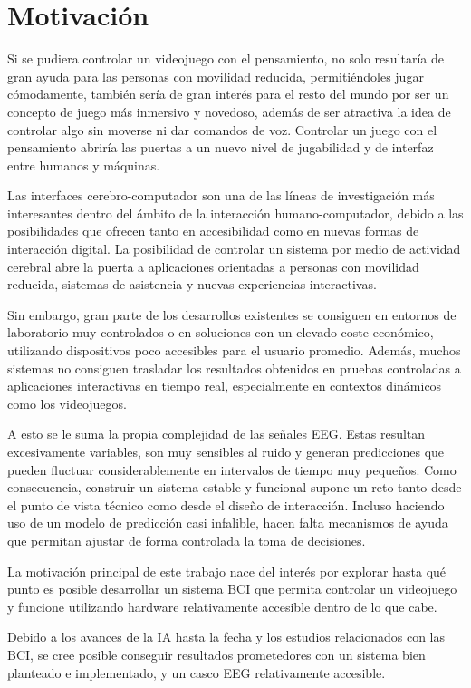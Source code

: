 \section{Motivación}

Si se pudiera controlar un videojuego con el pensamiento, no solo resultaría de
gran ayuda para las personas con movilidad reducida, permitiéndoles jugar
cómodamente, también sería de gran interés para el resto del mundo por ser un
concepto de juego más inmersivo y novedoso, además de ser atractiva la idea de
controlar algo sin moverse ni dar comandos de voz. Controlar un juego con el
pensamiento abriría las puertas a un nuevo nivel de jugabilidad y de interfaz
entre humanos y máquinas.

Las interfaces cerebro-computador son una de las líneas de investigación más
interesantes dentro del ámbito de la interacción humano-computador, debido a
las posibilidades que ofrecen tanto en accesibilidad como en nuevas formas de
interacción digital. La posibilidad de controlar un sistema por medio de
actividad cerebral abre la puerta a aplicaciones orientadas a personas con
movilidad reducida, sistemas de asistencia y nuevas experiencias interactivas.

Sin embargo, gran parte de los desarrollos existentes se consiguen en entornos
de laboratorio muy controlados o en soluciones con un elevado coste económico,
utilizando dispositivos poco accesibles para el usuario promedio. Además,
muchos sistemas no consiguen trasladar los resultados obtenidos en pruebas
controladas a aplicaciones interactivas en tiempo real, especialmente en
contextos dinámicos como los videojuegos.

A esto se le suma la propia complejidad de las señales EEG. Estas resultan
excesivamente variables, son muy sensibles al ruido y generan predicciones que
pueden fluctuar considerablemente en intervalos de tiempo muy pequeños. Como
consecuencia, construir un sistema estable y funcional supone un reto tanto
desde el punto de vista técnico como desde el diseño de interacción. Incluso
haciendo uso de un modelo de predicción casi infalible, hacen falta mecanismos
de ayuda que permitan ajustar de forma controlada la toma de decisiones.

La motivación principal de este trabajo nace del interés por explorar hasta qué
punto es posible desarrollar un sistema BCI que permita controlar un videojuego
y funcione utilizando hardware relativamente accesible dentro de lo que cabe.

Debido a los avances de la IA hasta la fecha y los estudios relacionados con
las BCI, se cree posible conseguir resultados prometedores con un sistema bien
planteado e implementado, y un casco EEG relativamente accesible.

